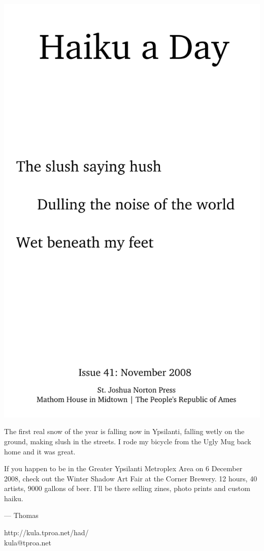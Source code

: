 \documentclass[12pt]{article}
\begin{document}
\includegraphics{frontpage.png}

\newpage

The first real snow of the year is falling now in Ypsilanti,
falling wetly on the ground, making slush in the streets. I
rode my bicycle from the Ugly Mug back home and it was great.

If you happen to be in the Greater Ypsilanti Metroplex Area
on 6 December 2008, check out the Winter Shadow Art Fair at
the Corner Brewery. 12 hours, 40 artists, 9000 gallons of
beer. I'll be there selling zines, photo prints and custom
haiku.

--- Thomas

http://kula.tproa.net/had/ \\
kula@tproa.net
\end{document}

